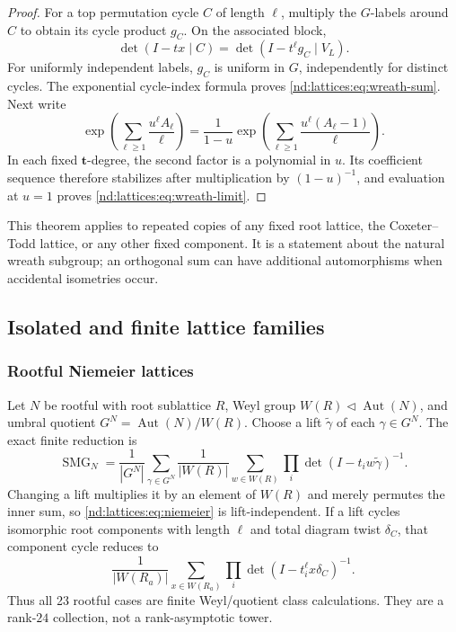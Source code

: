 \documentclass[10pt]{article}
\newcommand{\SMG}{\operatorname{SMG}}
\newcommand{\MGF}{\SMG}
\newcommand{\Aut}{\operatorname{Aut}}
\begin{document}
\begin{proof}
For a top permutation cycle $C$ of length $\ell$, multiply the $G$-labels
around $C$ to obtain its cycle product $g_C$.  On the associated block,
\[
 \det(I-tx\mid C)=\det(I-t^\ell g_C\mid V_L).
\]
For uniformly independent labels, $g_C$ is uniform in $G$, independently for
distinct cycles.  The exponential cycle-index formula proves
\eqref{nd:lattices:eq:wreath-sum}.  Next write
\[
 \exp\!\left(\sum_{\ell\ge1}\frac{u^\ell A_\ell}{\ell}\right)
 =\frac1{1-u}\exp\!\left(
 \sum_{\ell\ge1}\frac{u^\ell(A_\ell-1)}{\ell}\right).
\]
In each fixed $\mathbf t$-degree, the second factor is a polynomial in $u$.
Its coefficient sequence therefore stabilizes after multiplication by
$(1-u)^{-1}$, and evaluation at $u=1$ proves \eqref{nd:lattices:eq:wreath-limit}.
\end{proof}

This theorem applies to repeated copies of any fixed root lattice, the
Coxeter--Todd lattice, or any other fixed component.  It is a statement about
the natural wreath subgroup; an orthogonal sum can have additional
automorphisms when accidental isometries occur.

\subsection{Isolated and finite lattice families}

\subsubsection*{Rootful Niemeier lattices}
Let $N$ be rootful with root sublattice $R$, Weyl group
$W(R)\triangleleft\Aut(N)$, and umbral quotient
$G^N=\Aut(N)/W(R)$.  Choose a lift $\widetilde\gamma$ of each
$\gamma\in G^N$.  The exact finite reduction is
\begin{equation}\label{nd:lattices:eq:niemeier}
 \boxed{\MGF_N=\frac1{|G^N|}\sum_{\gamma\in G^N}\frac1{|W(R)|}
 \sum_{w\in W(R)}\prod_i\det(I-t_iw\widetilde\gamma)^{-1}.}
\end{equation}
Changing a lift multiplies it by an element of $W(R)$ and merely permutes the
inner sum, so \eqref{nd:lattices:eq:niemeier} is lift-independent.  If a lift cycles
isomorphic root components with length $\ell$ and total diagram twist
$\delta_C$, that component cycle reduces to
\begin{equation}\label{nd:lattices:eq:niemeier-component}
 \frac1{|W(R_a)|}\sum_{x\in W(R_a)}
 \prod_i\det(I-t_i^\ell x\delta_C)^{-1}.
\end{equation}
Thus all 23 rootful cases are finite Weyl/quotient class calculations.  They
are a rank-$24$ collection, not a rank-asymptotic tower.
\end{document}
